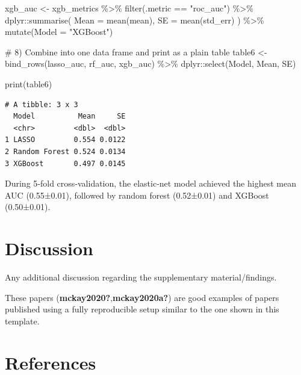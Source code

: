 \documentclass[
  letterpaper,
  DIV=11,
  numbers=noendperiod]{scrartcl}
\newenvironment{Shaded}{}{}
\newcommand{\AttributeTok}[1]{\textcolor[rgb]{0.84,0.23,0.29}{#1}}
\newcommand{\CommentTok}[1]{\textcolor[rgb]{0.42,0.45,0.49}{#1}}
\newcommand{\FunctionTok}[1]{\textcolor[rgb]{0.44,0.26,0.76}{#1}}
\newcommand{\NormalTok}[1]{\textcolor[rgb]{0.14,0.16,0.18}{#1}}
\newcommand{\OtherTok}[1]{\textcolor[rgb]{0.44,0.26,0.76}{#1}}
\newcommand{\SpecialCharTok}[1]{\textcolor[rgb]{0.00,0.36,0.77}{#1}}
\newcommand{\StringTok}[1]{\textcolor[rgb]{0.01,0.18,0.38}{#1}}
\begin{document}
\begin{Shaded}
\begin{Highlighting}[]
\NormalTok{xgb\_auc }\OtherTok{\textless{}{-}}\NormalTok{ xgb\_metrics }\SpecialCharTok{\%\textgreater{}\%}
  \FunctionTok{filter}\NormalTok{(.metric }\SpecialCharTok{==} \StringTok{"roc\_auc"}\NormalTok{) }\SpecialCharTok{\%\textgreater{}\%}
\NormalTok{  dplyr}\SpecialCharTok{::}\FunctionTok{summarise}\NormalTok{(}
    \AttributeTok{Mean =} \FunctionTok{mean}\NormalTok{(mean),}
    \AttributeTok{SE   =} \FunctionTok{mean}\NormalTok{(std\_err)}
\NormalTok{  ) }\SpecialCharTok{\%\textgreater{}\%}
  \FunctionTok{mutate}\NormalTok{(}\AttributeTok{Model =} \StringTok{"XGBoost"}\NormalTok{)}


\CommentTok{\# 8) Combine into one data frame and print as a plain table}
\NormalTok{table6 }\OtherTok{\textless{}{-}} \FunctionTok{bind\_rows}\NormalTok{(lasso\_auc, rf\_auc, xgb\_auc) }\SpecialCharTok{\%\textgreater{}\%}
\NormalTok{  dplyr}\SpecialCharTok{::}\FunctionTok{select}\NormalTok{(Model, Mean, SE)}

\FunctionTok{print}\NormalTok{(table6)}
\end{Highlighting}
\end{Shaded}

\begin{verbatim}
# A tibble: 3 x 3
  Model          Mean     SE
  <chr>         <dbl>  <dbl>
1 LASSO         0.554 0.0122
2 Random Forest 0.524 0.0134
3 XGBoost       0.497 0.0145
\end{verbatim}

During 5‑fold cross‑validation, the elastic‐net model achieved the
highest mean AUC (0.55±0.01), followed by random forest (0.52±0.01) and
XGBoost (0.50±0.01).

\newpage{}

\section{Discussion}\label{discussion}

Any additional discussion regarding the supplementary material/findings.

These papers (\textbf{mckay2020?},\textbf{mckay2020a?}) are good
examples of papers published using a fully reproducible setup similar to
the one shown in this template.

\newpage{}

\section{References}\label{references}
\end{document}
